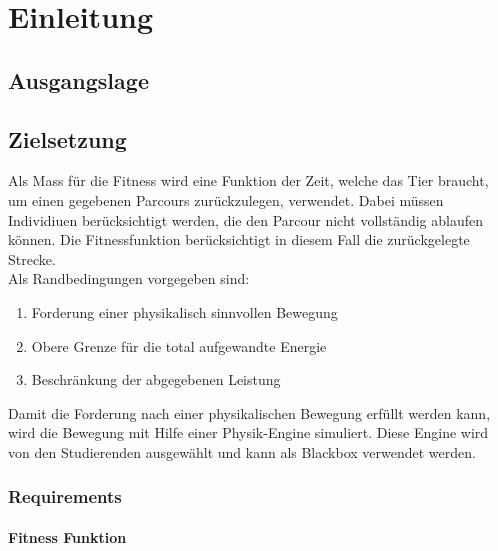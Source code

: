 %
%


\chapter{Einleitung}

  \lipsum[33-35]

\section{Ausgangslage}


\section{Zielsetzung}

  Als Mass für die Fitness wird eine Funktion der Zeit, welche das Tier braucht,
  um einen gegebenen Parcours zurückzulegen, verwendet.
  Dabei müssen Individiuen berücksichtigt werden,
  die den Parcour nicht vollständig ablaufen können.
  Die Fitnessfunktion berücksichtigt in diesem Fall die zurückgelegte Strecke.\\
  Als Randbedingungen vorgegeben sind:
  \begin{enumerate}
    \item Forderung einer physikalisch sinnvollen Bewegung
    \item Obere Grenze für die total aufgewandte Energie
    \item Beschränkung der abgegebenen Leistung
  \end{enumerate}
  Damit die Forderung nach einer physikalischen Bewegung erfüllt werden kann,
  wird die Bewegung mit Hilfe einer Physik-Engine simuliert.
  Diese Engine wird von den Studierenden ausgewählt und kann als Blackbox verwendet werden.

  \subsection{Requirements}

    \subsubsection{Fitness Funktion}

